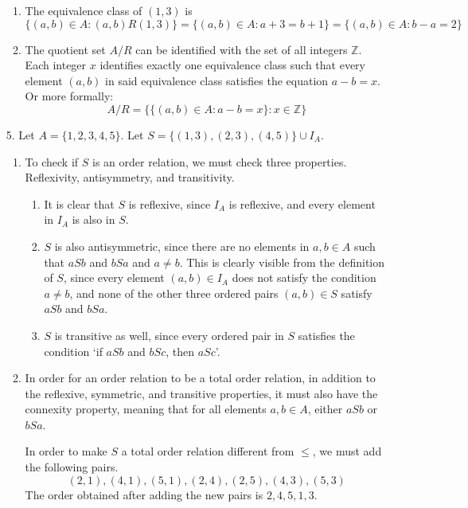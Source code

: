 \documentclass[fleqn]{article}
\begin{document}
\begin{enumerate}
\begin{enumerate}
		\item %
		The equivalence class of \((1, 3)\) is
		\[\{(a, b) \in A : (a, b)R(1, 3)\} = \{(a, b) \in A : a + 3 = b + 1\} = \{(a, b) \in A : b - a = 2\}\]

		\item %
		The quotient set \(A/R\) can be identified with the set of all integers \(\mathbb{Z}\). Each integer \(x\) identifies exactly one equivalence class such that every element \((a, b)\) in said equivalence class satisfies the equation \(a - b = x\). Or more formally:
		\[A/R = \{\{(a, b) \in A : a - b = x\} : x \in \mathbb{Z}\}\]
	\end{enumerate}

	\item[5.]
	Let \(A = \{1, 2, 3, 4, 5\}\). Let \(S = \{(1, 3), (2, 3), (4, 5)\} \cup I_A\).
	\begin{enumerate}
		\item %
		To check if \(S\) is an order relation, we must check three properties. Reflexivity, antisymmetry, and transitivity.
		\begin{enumerate}
			\item %
			It is clear that \(S\) is reflexive, since \(I_A\) is reflexive, and every element in \(I_A\) is also in \(S\).

			\item %
			\(S\) is also antisymmetric, since there are no elements in \(a, b \in A\) such that \(aSb\) and \(bSa\) and \(a \neq b\). This is clearly visible from the definition of \(S\), since every element \((a, b) \in I_A\) does not satisfy the condition \(a \neq b\), and none of the other three ordered pairs \((a, b) \in S\) satisfy \(aSb\) and \(bSa\).

			\item %
			\(S\) is transitive as well, since every ordered pair in \(S\) satisfies the condition `if \(aSb\) and \(bSc\), then \(aSc\)'.
		\end{enumerate}

		\item %
		In order for an order relation to be a total order relation, in addition to the reflexive, symmetric, and transitive properties, it must also have the connexity property, meaning that for all elements \(a, b \in A\), either \(aSb\) or \(bSa\).

		In order to make \(S\) a total order relation different from \(\leq\), we must add the following pairs.
		\[(2, 1), (4, 1), (5, 1), (2, 4), (2, 5), (4, 3), (5, 3)\]
		The order obtained after adding the new pairs is \(2, 4, 5, 1, 3\).
	\end{enumerate}


\end{enumerate}
\end{document}
